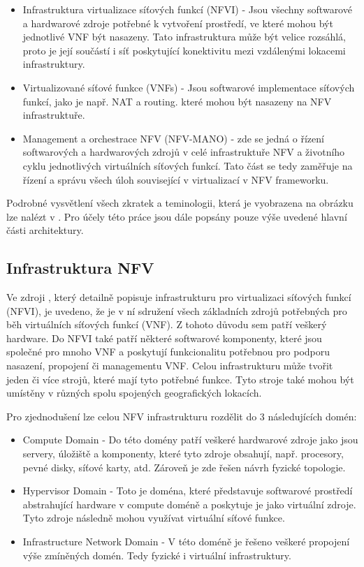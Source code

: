 \begin{itemize}
\item Infrastruktura virtualizace síťových funkcí (NFVI) - Jsou všechny softwarové a hardwarové zdroje potřebné k vytvoření prostředí, ve které mohou být jednotlivé VNF být nasazeny. Tato infrastruktura může být velice rozsáhlá, proto je její součástí i síť poskytující konektivitu mezi vzdálenými lokacemi infrastruktury.
\item Virtualizované síťové funkce (VNFs) - Jsou softwarové implementace síťových funkcí, jako je např. NAT a routing. které mohou být nasazeny na NFV infrastruktuře.
\item Management a orchestrace NFV (NFV-MANO) - zde se jedná o řízení softwarových a hardwarových zdrojů v celé infrastruktuře NFV a životního cyklu jednotlivých virtuálních síťových funkcí. Tato část se tedy zaměřuje na řízení a správu všech úloh související v virtualizací v NFV frameworku.
\end{itemize}

Podrobné vysvětlení všech zkratek a teminologii, která je vyobrazena na obrázku lze nalézt v \cite{NFV_terminology}. Pro účely této práce jsou dále popsány pouze výše uvedené hlavní části architektury.

\subsection{Infrastruktura NFV}

Ve zdroji \cite{NFV_infrastructure}, který detailně popisuje infrastrukturu pro virtualizaci síťových funkcí (NFVI), je uvedeno, že je v ní sdružení všech základních zdrojů potřebných pro běh virtuálních síťových funkcí (VNF). Z tohoto důvodu sem patří veškerý hardware. Do NFVI také patří některé softwarové komponenty, které jsou společné pro mnoho VNF a poskytují funkcionalitu potřebnou pro podporu nasazení, propojení či managementu VNF. Celou infrastrukturu může tvořit jeden či více strojů, které mají tyto potřebné funkce. Tyto stroje také mohou být umístěny v různých spolu spojených geografických lokacích. 

Pro zjednodušení lze celou NFV infrastrukturu rozdělit do 3 následujících domén:

\begin{itemize}
\item Compute Domain - Do této domény patří veškeré hardwarové zdroje jako jsou servery, úložiště a komponenty, které tyto zdroje obsahují, např. procesory, pevné disky, síťové karty, atd. Zároveň je zde řešen návrh fyzické topologie. \cite{NFV_compute}
\item Hypervisor Domain - Toto je doména, které představuje softwarové prostředí abstrahující hardware v compute doméně a poskytuje je jako virtuální zdroje. Tyto zdroje následně mohou využívat virtuální síťové funkce. \cite{NFV_hypervisor}
\item Infrastructure Network Domain - V této doméně je řešeno veškeré propojení výše zmíněných domén. Tedy fyzické i virtuální infrastruktury.\cite{NFV_network}
\end{itemize}

